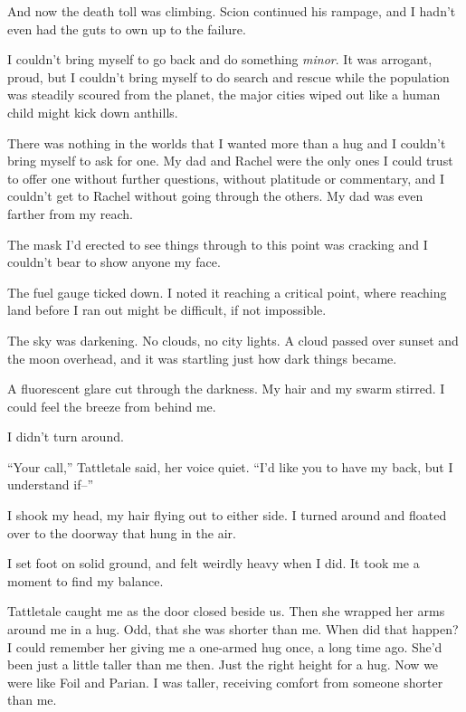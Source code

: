And now the death toll was climbing.  Scion continued his rampage, and I hadn't even had the guts to own up to the failure.



I couldn't bring myself to go back and do something \emph{minor}.  It was arrogant, proud, but I couldn't bring myself to do search and rescue while the population was steadily scoured from the planet, the major cities wiped out like a human child might kick down anthills.



There was nothing in the worlds that I wanted more than a hug and I couldn't bring myself to ask for one.  My dad and Rachel were the only ones I could trust to offer one without further questions, without platitude or commentary, and I couldn't get to Rachel without going through the others.  My dad was even farther from my reach.



The mask I'd erected to see things through to this point was cracking and I couldn't bear to show anyone my face.



The fuel gauge ticked down.  I noted it reaching a critical point, where reaching land before I ran out might be difficult, if not impossible.



The sky was darkening.  No clouds, no city lights.  A cloud passed over sunset and the moon overhead, and it was startling just how dark things became.



A fluorescent glare cut through the darkness.  My hair and my swarm stirred.  I could feel the breeze from behind me.



I didn't turn around.



``Your call,'' Tattletale said, her voice quiet.  ``I'd like you to have my back, but I understand if--''



I shook my head, my hair flying out to either side.  I turned around and floated over to the doorway that hung in the air.



I set foot on solid ground, and felt weirdly heavy when I did.  It took me a moment to find my balance.



Tattletale caught me as the door closed beside us.  Then she wrapped her arms around me in a hug.  Odd, that she was shorter than me.  When did that happen?  I could remember her giving me a one-armed hug once, a long time ago.  She'd been just a little taller than me then.  Just the right height for a hug.  Now we were like Foil and Parian.  I was taller, receiving comfort from someone shorter than me.



